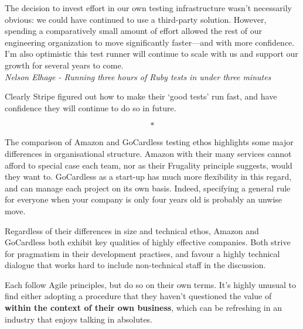 \documentclass[11pt]{article}
\begin{document}
\begin{displayquote}

  The decision to invest effort in our own testing infrastructure wasn't
  necessarily obvious: we could have continued to use a third-party solution.
  However, spending a comparatively small amount of effort allowed the rest of our
  engineering organization to move significantly faster—and with more confidence.
  I'm also optimistic this test runner will continue to scale with us and support
  our growth for several years to come.\\

  \textit{Nelson Elhage - Running three hours of Ruby tests in under three
  minutes~\cite{stripeDistributedTesting}}

\end{displayquote}

Clearly Stripe figured out how to make their `good tests' run fast, and have
confidence they will continue to do so in future.

\[*\]

The comparison of Amazon and GoCardless testing ethos highlights some major
differences in organisational structure. Amazon with their many services cannot
afford to special case each team, nor as their Frugality principle suggests,
would they want to. GoCardless as a start-up has much more flexibility in this
regard, and can manage each project on its own basis. Indeed, specifying a
general rule for everyone when your company is only four years old is probably
an unwise move.

Regardless of their differences in size and technical ethos, Amazon and
GoCardless both exhibit key qualities of highly effective companies. Both strive
for pragmatism in their development practises, and favour a highly technical
dialogue that works hard to include non-technical staff in the discussion.

Each follow Agile principles, but do so on their own terms. It's highly unusual
to find either adopting a procedure that they haven't questioned the value of
\textbf{within the context of their own business}, which can be refreshing in an
industry that enjoys talking in absolutes.



\medskip
{}

\newpage
\end{document}
